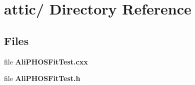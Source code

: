 \section{attic/ Directory Reference}
\label{dir_000000}
\subsection*{Files}
\begin{CompactItemize}
\item 
file {\bf Ali\-PHOSFit\-Test.cxx}
\item 
file {\bf Ali\-PHOSFit\-Test.h}
\end{CompactItemize}
